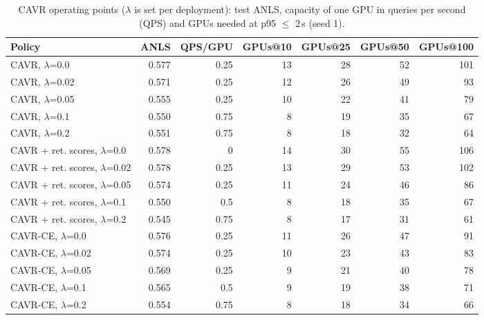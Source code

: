 \begin{table}[t]
\centering
\caption{CAVR operating points ($\lambda$ is set per deployment): test ANLS, capacity of one GPU in queries per second (QPS) and GPUs needed at p95 $\leq$ 2\,s (seed 1).}
\label{tab:load_test_ops}
\begin{adjustbox}{max width=\linewidth}
\begin{tabular}{lrrrrrr}
\toprule
\textbf{Policy} & \textbf{ANLS} & \textbf{QPS/GPU} & \textbf{GPUs@10} & \textbf{GPUs@25} & \textbf{GPUs@50} & \textbf{GPUs@100} \\
\midrule
CAVR, $\lambda$=0.0 & 0.577 & 0.25 & 13 & 28 & 52 & 101 \\
CAVR, $\lambda$=0.02 & 0.571 & 0.25 & 12 & 26 & 49 & 93 \\
CAVR, $\lambda$=0.05 & 0.555 & 0.25 & 10 & 22 & 41 & 79 \\
CAVR, $\lambda$=0.1 & 0.550 & 0.75 & 8 & 19 & 35 & 67 \\
CAVR, $\lambda$=0.2 & 0.551 & 0.75 & 8 & 18 & 32 & 64 \\
CAVR + ret. scores, $\lambda$=0.0 & 0.578 & 0 & 14 & 30 & 55 & 106 \\
CAVR + ret. scores, $\lambda$=0.02 & 0.578 & 0.25 & 13 & 29 & 53 & 102 \\
CAVR + ret. scores, $\lambda$=0.05 & 0.574 & 0.25 & 11 & 24 & 46 & 86 \\
CAVR + ret. scores, $\lambda$=0.1 & 0.550 & 0.5 & 8 & 18 & 35 & 67 \\
CAVR + ret. scores, $\lambda$=0.2 & 0.545 & 0.75 & 8 & 17 & 31 & 61 \\
CAVR-CE, $\lambda$=0.0 & 0.576 & 0.25 & 11 & 26 & 47 & 91 \\
CAVR-CE, $\lambda$=0.02 & 0.574 & 0.25 & 10 & 23 & 43 & 83 \\
CAVR-CE, $\lambda$=0.05 & 0.569 & 0.25 & 9 & 21 & 40 & 78 \\
CAVR-CE, $\lambda$=0.1 & 0.565 & 0.5 & 9 & 19 & 38 & 71 \\
CAVR-CE, $\lambda$=0.2 & 0.554 & 0.75 & 8 & 18 & 34 & 66 \\
\bottomrule
\end{tabular}
\end{adjustbox}
\end{table}
